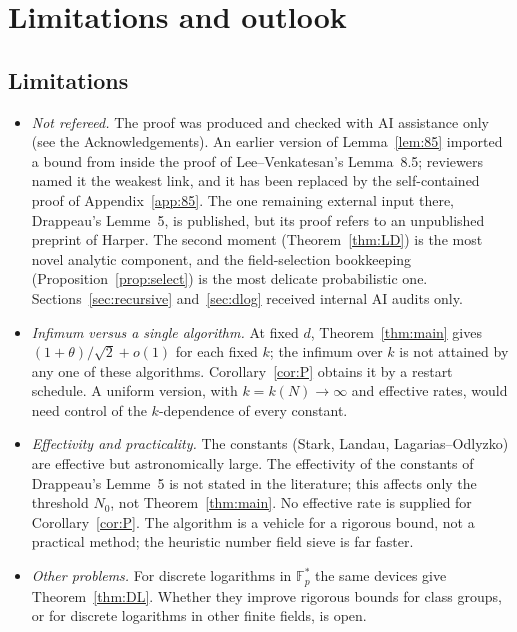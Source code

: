 \documentclass[11pt]{amsart}
\theoremstyle{definition}
\newcommand{\F}{\mathbb{F}}
\begin{document}
\section{Limitations and outlook}\label{sec:limits}

\subsection{Limitations}
\begin{itemize}
\item \emph{Not refereed.} The proof was produced and checked with AI assistance only (see the Acknowledgements). An earlier version of
  Lemma~\ref{lem:85} imported a bound from inside the proof of Lee--Venkatesan's Lemma~8.5; reviewers named it the weakest link,
  and it has been replaced by the self-contained proof of Appendix~\ref{app:85}. The one remaining external input there, Drappeau's
  Lemme~5, is published, but its proof refers to an unpublished preprint of Harper. The second moment
  (Theorem~\ref{thm:LD}) is the most novel analytic component, and the field-selection bookkeeping (Proposition~\ref{prop:select}) is
  the most delicate probabilistic one. Sections~\ref{sec:recursive} and~\ref{sec:dlog} received internal AI audits only.
\item \emph{Infimum versus a single algorithm.} At fixed $d$, Theorem~\ref{thm:main} gives $(1+\theta)/\sqrt2+o(1)$ for each fixed $k$; the infimum
  over $k$ is not attained by any one of these algorithms. Corollary~\ref{cor:P} obtains it by a restart schedule. A uniform
  version, with $k=k(N)\to\infty$ and effective rates, would need control of the $k$-dependence of every constant.
\item \emph{Effectivity and practicality.} The constants (Stark, Landau, Lagarias--Odlyzko) are effective but astronomically large. The
  effectivity of the constants of Drappeau's Lemme~5 is not stated in the literature; this affects only the threshold $N_0$, not
  Theorem~\ref{thm:main}. No effective rate is supplied for Corollary~\ref{cor:P}. The algorithm is a vehicle for a rigorous bound, not a practical
  method; the heuristic number field sieve is far faster.
\item \emph{Other problems.} For discrete logarithms in $\F_p^*$ the same devices give Theorem~\ref{thm:DL}. Whether they improve rigorous bounds
  for class groups, or for discrete logarithms in other finite fields, is open.
\end{itemize}
\end{document}
